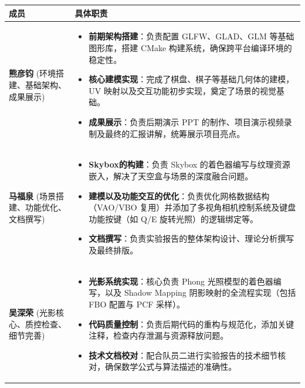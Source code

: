 \documentclass[a4paper]{article}
\begin{document}
\begin{tcolorbox}[colback=yellow!10!white, colframe=brown!70!black, title=\textbf{小组成员分工表}]
\begin{tabular}{p{} | p{}}
\toprule
\textbf{成员} & \textbf{具体职责} \\
\midrule
\textbf{熊彦钧} \newline (环境搭建、基础架构、成果展示) & 
\begin{itemize}
    \item \textbf{前期架构搭建}：负责配置 GLFW、GLAD、GLM 等基础图形库，搭建 CMake 构建系统，确保跨平台编译环境的稳定性。
    \item \textbf{核心建模实现}：完成了棋盘、棋子等基础几何体的建模， UV 映射以及交互功能初步实现，奠定了场景的视觉基础。
    \item \textbf{成果展示}：负责后期演示 PPT 的制作、项目演示视频录制及最终的汇报讲解，统筹展示项目亮点。
\end{itemize} \\
\midrule
\textbf{马福泉} \newline (场景搭建、功能优化、文档撰写) & 
\begin{itemize}
    \item \textbf{Skybox的构建}：负责 Skybox 的着色器编写与纹理资源嵌入，解决了天空盒与场景的深度融合问题。
    \item \textbf{建模以及功能交互的优化}：负责优化网格数据结构（VAO/VBO 复用）并添加了多视角相机控制系统及键盘功能按键（如 Q/E 旋转光照）的逻辑绑定等。
    \item \textbf{文档撰写}：负责实验报告的整体架构设计、理论分析撰写及最终排版。
\end{itemize} \\
\midrule
\textbf{吴深荣} \newline (光影核心、质控检查、细节完善) & 
\begin{itemize}
    \item \textbf{光影系统实现}：核心负责 Phong 光照模型的着色器编写，以及 Shadow Mapping 阴影映射的全流程实现（包括 FBO 配置与 PCF 采样）。
    \item \textbf{代码质量控制}：负责后期代码的重构与规范化，添加关键注释，检查内存泄漏与资源释放问题。
    \item \textbf{技术文档校对}：配合队员二进行实验报告的技术细节核对，确保数学公式与算法描述的准确性。
\end{itemize} \\
\bottomrule
\end{tabular}
\end{tcolorbox}
\end{document}
